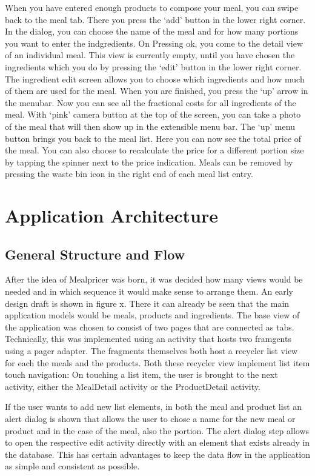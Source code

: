 \documentclass[a4paper,11pt,twoside]{article}
\begin{document}
When you have entered enough products to compose your meal, you can swipe back
to the meal tab. There you press the `add' button in the lower right corner.
In the dialog, you can choose the name of the meal and for how many portions
you want to enter the indgredients. On Pressing ok, you come to the detail
view of an individual meal. This view is currently empty, until you have chosen
the ingredients which you do by pressing the `edit' button in the lower right
corner. The ingredient edit screen allows you to choose which ingredients and
how much of them are used for the meal. When you are finished, you press the
`up' arrow in the menubar. Now you can see all the fractional costs for all
ingredients of the meal. With `pink' camera button at the top of the screen,
you can take a photo of the meal that will then show up in the extensible
menu bar. The `up' menu button brings you back to the meal list. Here you can
now see the total price of the meal. You can also choose to recalculate the
price for a different portion size by tapping the spinner next to the price
indication. Meals can be removed by pressing the waste bin icon in the right
end of each meal list entry.



\section{Application Architecture}
\subsection{General Structure and Flow}
After the idea of Mealpricer was born, it was decided how many views
would be needed and in which sequence it would make sense to arrange them. An
early design draft is shown in figure x. There it can already be seen that the
main application models would be meals, products and ingredients. The base view
of the application was chosen to consist of two pages that are connected as
tabs. Technically, this was implemented using an activity that hosts two framgents
using a pager adapter. The fragments themselves both host a recycler list view
for each the meals and the products. Both these recycler view implement list
item touch navigation: On touching a list item, the user is brought to the next
activity, either the MealDetail activity or the ProductDetail activity.

If the user wants to add new list elements, in both the meal and product list an
alert dialog is shown that allows the user to chose a name for the new meal or
product and in the case of the meal, also the portion. The alert dialog step allows
to open the respective edit activity directly with an element that exists already
in the database. This has certain advantages to keep the data flow in the application
as simple and consistent as possible.
\end{document}
